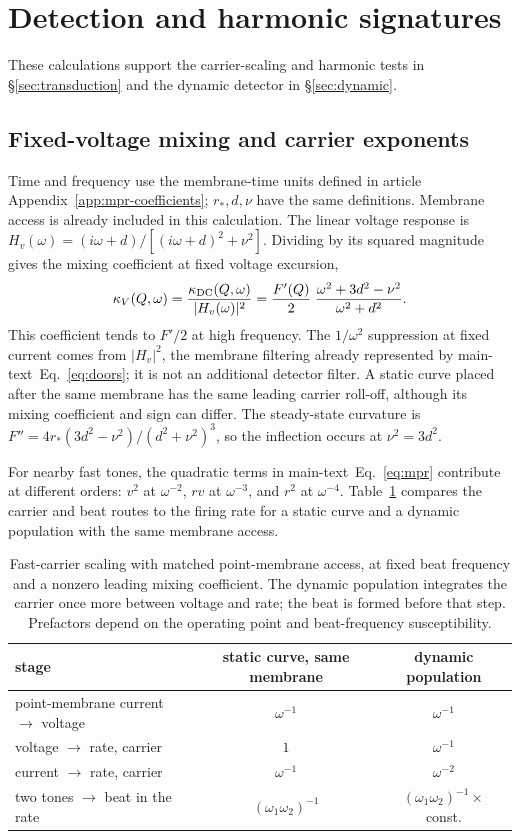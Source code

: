 \section{Detection and harmonic signatures}\label{supp:detection}
These calculations support the carrier-scaling and harmonic tests in
\S\ref{sec:transduction} and the dynamic detector in \S\ref{sec:dynamic}.
\subsection{Fixed-voltage mixing and carrier exponents}\label{supp:dynamic-details}
Time and frequency use the membrane-time units defined in article
Appendix~\ref{app:mpr-coefficients}; $r_*,d,\nu$ have the same definitions.
Membrane access is already included in this calculation. The linear voltage response
is $H_v(\omega)=(i\omega+d)/[(i\omega+d)^2+\nu^2]$. Dividing by its squared magnitude
gives the mixing coefficient at fixed voltage excursion,
\begin{equation}
\kappa_V(Q,\omega)=\frac{\kappa_{\rm DC}(Q,\omega)}{|H_v(\omega)|^2}
=\frac{F'(Q)}{2}\;\frac{\omega^2+3d^2-\nu^2}{\omega^2+d^2}.
\label{eq:kfixed}
\end{equation}
This coefficient tends to $F'/2$ at high frequency. The $1/\omega^2$ suppression
at fixed current comes from $|H_v|^2$, the membrane filtering already represented
by \ifsupp main-text\fi\ Eq.~\eqref{eq:doors}; it is not an additional detector filter. A static curve
placed after the same membrane has the same leading carrier roll-off, although
its mixing coefficient and sign can differ. The steady-state curvature is
$F''=4r_*(3d^2-\nu^2)/(d^2+\nu^2)^3$, so the inflection occurs at $\nu^2=3d^2$.

For nearby fast tones, the quadratic terms in \ifsupp main-text\fi\ Eq.~\eqref{eq:mpr} contribute at
different orders: $v^2$ at $\omega^{-2}$, $r v$ at $\omega^{-3}$, and $r^2$ at
$\omega^{-4}$. Table~\ref{tab:exponents} compares the carrier and beat routes to
the firing rate for a static curve and a dynamic population with the same membrane access.

\begin{table}[h]
\centering\small
\begin{tabular}{lcc}
\toprule
stage & static curve, same membrane & dynamic population \\
\midrule
point-membrane current $\to$ voltage & $\omega^{-1}$ & $\omega^{-1}$ \\
voltage $\to$ rate, carrier & $1$ & $\omega^{-1}$ \\
current $\to$ rate, carrier & $\omega^{-1}$ & $\omega^{-2}$ \\
two tones $\to$ beat in the rate & $(\omega_1\omega_2)^{-1}$ & $(\omega_1\omega_2)^{-1}\times$ const. \\
\bottomrule
\end{tabular}
\caption{Fast-carrier scaling with matched point-membrane access, at fixed beat frequency
and a nonzero leading mixing coefficient. The dynamic population integrates the
carrier once more between voltage and rate; the beat is formed before that step.
Prefactors depend on the operating point and beat-frequency susceptibility.}
\label{tab:exponents}
\end{table}

